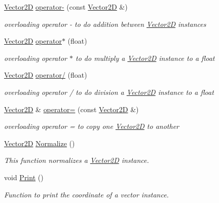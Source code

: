 \begin{DoxyCompactItemize}
\hyperlink{classcsci3081_1_1Vector2D}{Vector2D} \hyperlink{classcsci3081_1_1Vector2D_a8ccf17ebee11a2f8f3ce66dd9dec8a13}{operator-\/} (const \hyperlink{classcsci3081_1_1Vector2D}{Vector2D} \&)
\begin{DoxyCompactList}\small\item\em overloading operator -\/ to do addition between \hyperlink{classcsci3081_1_1Vector2D}{Vector2D} instances \end{DoxyCompactList}\item 
\hyperlink{classcsci3081_1_1Vector2D}{Vector2D} \hyperlink{classcsci3081_1_1Vector2D_a73ad5eb3819cfc93eba7d542abf54acf}{operator$\ast$} (float)
\begin{DoxyCompactList}\small\item\em overloading operator $\ast$ to do multiply a \hyperlink{classcsci3081_1_1Vector2D}{Vector2D} instance to a float \end{DoxyCompactList}\item 
\hyperlink{classcsci3081_1_1Vector2D}{Vector2D} \hyperlink{classcsci3081_1_1Vector2D_a9e123abdcebfb672cea47d705604a968}{operator/} (float)
\begin{DoxyCompactList}\small\item\em overloading operator / to do division a \hyperlink{classcsci3081_1_1Vector2D}{Vector2D} instance to a float \end{DoxyCompactList}\item 
\hyperlink{classcsci3081_1_1Vector2D}{Vector2D} \& \hyperlink{classcsci3081_1_1Vector2D_a91ae4915d5eee2fcccf2fedf6d6e7309}{operator=} (const \hyperlink{classcsci3081_1_1Vector2D}{Vector2D} \&)
\begin{DoxyCompactList}\small\item\em overloading operator = to copy one \hyperlink{classcsci3081_1_1Vector2D}{Vector2D} to another \end{DoxyCompactList}\item 
\mbox{\label{classcsci3081_1_1Vector2D_a794e9b3fd7a07dc50c823a8fded0b4e1}} 
\hyperlink{classcsci3081_1_1Vector2D}{Vector2D} \hyperlink{classcsci3081_1_1Vector2D_a794e9b3fd7a07dc50c823a8fded0b4e1}{Normalize} ()
\begin{DoxyCompactList}\small\item\em This function normalizes a \hyperlink{classcsci3081_1_1Vector2D}{Vector2D} instance. \end{DoxyCompactList}\item 
void \hyperlink{classcsci3081_1_1Vector2D_af849fc65ec2d153b53884c8de818fae6}{Print} ()
\begin{DoxyCompactList}\small\item\em Function to print the coordinate of a vector instance. \end{DoxyCompactList}\end{DoxyCompactItemize}
